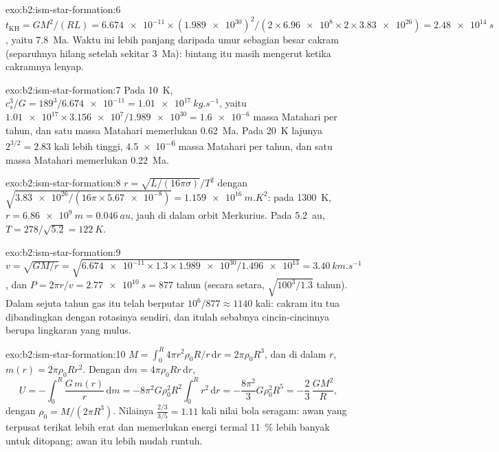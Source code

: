\begin{solution}{exo:b2:ism-star-formation:6}
$t_{\mathrm{KH}} = GM^2/(RL) = \num{6.674e-11}\times(\num{1.989e30})^2/(2\times
\num{6.96e8}\times2\times\num{3.83e26}) = \qty{2.48e14}{s}$, yaitu
\qty{7.8}{Ma}. Waktu ini lebih panjang daripada umur sebagian besar cakram (separuhnya hilang setelah
sekitar \qty{3}{Ma}): bintang itu masih mengerut ketika cakramnya lenyap.
\end{solution}

\begin{solution}{exo:b2:ism-star-formation:7}
Pada \qty{10}{K}, $c_s^3/G = 189^3/\num{6.674e-11} = \qty{1.01e17}{kg.s^{-1}}$, yaitu
$\num{1.01e17}\times\num{3.156e7}/\num{1.989e30} = \num{1.6e-6}$ massa Matahari per
tahun, dan satu massa Matahari memerlukan \qty{0.62}{Ma}. Pada \qty{20}{K} lajunya
$2^{3/2} = 2.83$ kali lebih tinggi, \num{4.5e-6} massa Matahari per tahun, dan satu massa
Matahari memerlukan \qty{0.22}{Ma}.
\end{solution}

\begin{solution}{exo:b2:ism-star-formation:8}
$r = \sqrt{L/(16\pi\sigma)}/T^2$ dengan $\sqrt{\num{3.83e26}/(16\pi\times\num{5.67e-8})}
= \qty{1.159e16}{m.K^2}$: pada \qty{1300}{K}, $r = \qty{6.86e9}{m} = \qty{0.046}{au}$,
jauh di dalam orbit Merkurius. Pada \qty{5.2}{au}, $T = 278/\sqrt{5.2} = \qty{122}{K}$.
\end{solution}

\begin{solution}{exo:b2:ism-star-formation:9}
$v = \sqrt{GM/r} = \sqrt{\num{6.674e-11}\times1.3\times\num{1.989e30}/\num{1.496e13}}
= \qty{3.40}{km.s^{-1}}$, dan $P = 2\pi r/v = \qty{2.77e10}{s} = 877$ tahun
(secara setara, $\sqrt{100^3/1.3}$ tahun). Dalam sejuta tahun gas itu telah berputar
$10^6/877 \approx \num{1140}$ kali: cakram itu tua dibandingkan dengan rotasinya sendiri,
dan itulah sebabnya cincin-cincinnya berupa lingkaran yang mulus.
\end{solution}

\begin{solution}{exo:b2:ism-star-formation:10}
$M = \int_0^R 4\pi r^2\rho_0R/r\,\mathrm dr = 2\pi\rho_0R^3$, dan di dalam $r$,
$m(r) = 2\pi\rho_0Rr^2$. Dengan $\mathrm dm = 4\pi\rho_0Rr\,\mathrm dr$,
\[
  U = -\int_0^R \frac{G\,m(r)}{r}\,\mathrm dm
    = -8\pi^2G\rho_0^2R^2\int_0^R r^2\,\mathrm dr = -\frac{8\pi^2}{3}G\rho_0^2R^5
    = -\frac23\,\frac{GM^2}{R},
\]
dengan $\rho_0 = M/(2\pi R^3)$. Nilainya $\tfrac{2/3}{3/5} = 1.11$ kali nilai bola seragam:
awan yang terpusat terikat lebih erat dan memerlukan energi termal \qty{11}{\percent} lebih
banyak untuk ditopang; awan itu lebih mudah runtuh.
\end{solution}

